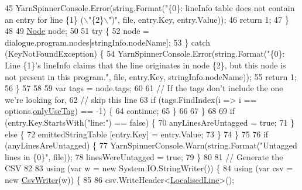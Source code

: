 \begin{DoxyCode}
45                             YarnSpinnerConsole.Error(string.Format(\textcolor{stringliteral}{"\{0\}: lineInfo table does not contain an
       entry for line \{1\} (\(\backslash\)"\{2\}\(\backslash\)")"}, file, entry.Key, entry.Value));
46                             \textcolor{keywordflow}{return} 1;
47                         \}
48 
49                         \hyperlink{a00045_a00367}{Node} node;
50 
51                         \textcolor{keywordflow}{try} \{
52                             node = dialogue.program.nodes[stringInfo.nodeName];
53                         \} \textcolor{keywordflow}{catch} (KeyNotFoundException) \{
54                             YarnSpinnerConsole.Error(string.Format(\textcolor{stringliteral}{"\{0\}: Line \{1\}'s lineInfo claims that
       the line originates in node \{2\}, but this node is not present in this program."}, file, entry.Key, 
      stringInfo.nodeName));
55                             \textcolor{keywordflow}{return} 1;
56                         \}
57 
58 
59                         var tags = node.tags;
60 
61                         \textcolor{comment}{// If the tags don't include the one we're looking for,}
62                         \textcolor{comment}{// skip this line}
63                         \textcolor{keywordflow}{if} (tags.FindIndex(i => i == options.\hyperlink{a00101_a8b30c1b7fb1b74eae455a568c1024b3d}{onlyUseTag}) == -1) \{
64                             \textcolor{keywordflow}{continue};
65                         \}
66 
67                     \}
68 
69                     \textcolor{keywordflow}{if} (entry.Key.StartsWith(\textcolor{stringliteral}{"line:"}) == \textcolor{keyword}{false}) \{
70                         anyLinesAreUntagged = \textcolor{keyword}{true};
71                     \} \textcolor{keywordflow}{else} \{
72                         emittedStringTable [entry.Key] = entry.Value;
73                     \}
74                 \}
75 
76                 \textcolor{keywordflow}{if} (anyLinesAreUntagged) \{
77                     YarnSpinnerConsole.Warn(string.Format(\textcolor{stringliteral}{"Untagged lines in \{0\}"}, file));
78                     linesWereUntagged = \textcolor{keyword}{true};
79                 \}
80 
81                 \textcolor{comment}{// Generate the CSV}
82 
83                 \textcolor{keyword}{using} (var w = \textcolor{keyword}{new} System.IO.StringWriter()) \{
84                     \textcolor{keyword}{using} (var csv = \textcolor{keyword}{new} \hyperlink{a00075}{CsvWriter}(w)) \{
85 
86                         csv.WriteHeader<\hyperlink{a00128}{LocalisedLine}>();

\end{DoxyCode}

